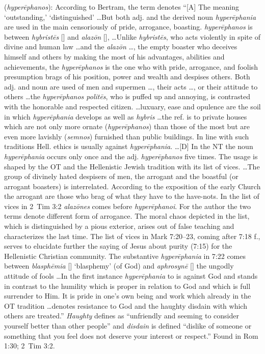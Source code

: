 \item[Haughty disdainer,]

(\textit{hyperēphanos}):
According to Bertram, the term denotes ``[A] The meaning `outstanding,' `distinguished' \ldots But both adj. and the derived noun \emph{hyperēphania} are used in the main censoriously of pride, arrogance, boasting. \emph{hyperēphanos} is between \emph{hybristēs} [] and \emph{alazōn} [], \ldots Unlike \emph{hybristēs}, who acts violently in spite of divine and human law \ldots and the \emph{alazōn} \ldots, the empty boaster who deceives himself and others by making the most of his advantages, abilities and achievements, the \emph{hyperēphanos} is the one who with pride, arrogance, and foolish presumption brags of his position, power  and wealth and despises others. Both adj. and noun are used of men and supermen \ldots, their acts \ldots, or their attitude to others \ldots the \emph{hyperēphanos politēs}, who is puffed up and annoying, is contrasted with the honorable and respected citizen. \ldots luxuary, ease and opulence are the soil in which \emph{hyperēphania} develops as well as \emph{hybris} \ldots the ref. is to private houses which are not only more ornate (\emph{hyperēphanos}) than those of the most but are even more lavishly  (\emph{semnos}) furnished than public buildings. In line with such traditions Hell. ethics is usually against \emph{hyperēphania}. \ldots [D] In the NT the noun \emph{hyperēphania} occurs only once and the adj. \emph{hyperēphanos} five times. The usage is shaped by the OT and the Hellenistic Jewish tradition with its list of vices. \ldots The group of divinely hated despisers of men, the arrogant and the boastful (or arrogant boasters) is interrelated. According to the exposition of the early Church the arrogant are those who brag of what they have to the have-nots. In the list of vices in 2~Tim 3:2 \emph{alazōnes} comes before \emph{hyperēphanoi}. For the author the two terms denote different form of arrogance. The moral chaos depicted in the list, which is distinguished by a pious exterior, arises out of false teaching and characterizes the last time. The list of vices in Mark 7:20--23, coming after 7:18 f., serves to elucidate further the saying of Jesus about purity (7:15) for the Hellenistic Christian community. The substantive \emph{hyperēphania} in 7:22 comes between \emph{blasphēmia} [] `blasphemy' (of God) and \emph{aphrosynē} [] the ungodly attitude of fools \ldots In the first instance \emph{hyperēphania} to is against God and stands in contrast to the humility which is proper in relation to God and which is full surrender to Him. It is pride in one's own being and work which already in the OT tradition \ldots denotes resistance to God and the haughty disdain with which others are treated.''
\emph{Haughty} defines as ``unfriendly and seeming to consider yourself better than other people'' and \emph{disdain} is defined ``dislike of someone or something that you feel does not deserve your interest or respect.''
Found in Rom 1:30; 2~Tim 3:2.
